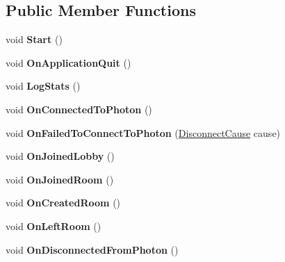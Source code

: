\subsection*{Public Member Functions}
\begin{DoxyCompactItemize}
\item 
void {\bfseries Start} ()\hypertarget{class_support_logging_a8325891b30735e37ee21149ab01fc728}{}\label{class_support_logging_a8325891b30735e37ee21149ab01fc728}

\item 
void {\bfseries On\+Application\+Quit} ()\hypertarget{class_support_logging_ad3ba63b59fde5fae3ec3ae4757ab86ef}{}\label{class_support_logging_ad3ba63b59fde5fae3ec3ae4757ab86ef}

\item 
void {\bfseries Log\+Stats} ()\hypertarget{class_support_logging_a2cf1e7f4fdfb3329552d5506598046fe}{}\label{class_support_logging_a2cf1e7f4fdfb3329552d5506598046fe}

\item 
void {\bfseries On\+Connected\+To\+Photon} ()\hypertarget{class_support_logging_a2fd44e6b53c8ae0bf3742a534fb1136a}{}\label{class_support_logging_a2fd44e6b53c8ae0bf3742a534fb1136a}

\item 
void {\bfseries On\+Failed\+To\+Connect\+To\+Photon} (\hyperlink{group__public_api_gad61b1461cf60ad9e8d86923d111d5cc9}{Disconnect\+Cause} cause)\hypertarget{class_support_logging_a49bad1d64e88101d025b2df390a69c09}{}\label{class_support_logging_a49bad1d64e88101d025b2df390a69c09}

\item 
void {\bfseries On\+Joined\+Lobby} ()\hypertarget{class_support_logging_afd95b3b1a9408719cddbf961997ed25c}{}\label{class_support_logging_afd95b3b1a9408719cddbf961997ed25c}

\item 
void {\bfseries On\+Joined\+Room} ()\hypertarget{class_support_logging_a32ed60880380b9e3daca71cc166c179c}{}\label{class_support_logging_a32ed60880380b9e3daca71cc166c179c}

\item 
void {\bfseries On\+Created\+Room} ()\hypertarget{class_support_logging_a4ab7ea38ffc9ab875bcd9376474b4179}{}\label{class_support_logging_a4ab7ea38ffc9ab875bcd9376474b4179}

\item 
void {\bfseries On\+Left\+Room} ()\hypertarget{class_support_logging_a5bd93b68fab7fe19d7fee58241f20676}{}\label{class_support_logging_a5bd93b68fab7fe19d7fee58241f20676}

\item 
void {\bfseries On\+Disconnected\+From\+Photon} ()\hypertarget{class_support_logging_a87ce7d6e2c42e9d1d61df4173decbe13}{}\label{class_support_logging_a87ce7d6e2c42e9d1d61df4173decbe13}

\end{DoxyCompactItemize}

